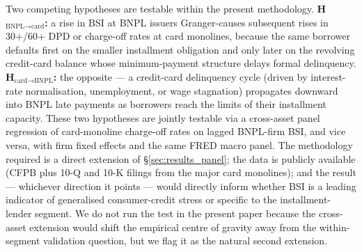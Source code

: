 \documentclass[11pt,a4paper]{article}
\begin{document}
Two competing hypotheses are testable within the present methodology. \textbf{H$_{\text{BNPL} \to \text{card}}$:} a rise in BSI at BNPL issuers Granger-causes subsequent rises in 30+/60+ DPD or charge-off rates at card monolines, because the same borrower defaults first on the smaller installment obligation and only later on the revolving credit-card balance whose minimum-payment structure delays formal delinquency. \textbf{H$_{\text{card} \to \text{BNPL}}$:} the opposite --- a credit-card delinquency cycle (driven by interest-rate normalisation, unemployment, or wage stagnation) propagates downward into BNPL late payments as borrowers reach the limits of their installment capacity. These two hypotheses are jointly testable via a cross-asset panel regression of card-monoline charge-off rates on lagged BNPL-firm BSI, and vice versa, with firm fixed effects and the same FRED macro panel. The methodology required is a direct extension of §\ref{sec:results_panel}; the data is publicly available (CFPB plus 10-Q and 10-K filings from the major card monolines); and the result --- whichever direction it points --- would directly inform whether BSI is a leading indicator of generalised consumer-credit stress or specific to the installment-lender segment. We do not run the test in the present paper because the cross-asset extension would shift the empirical centre of gravity away from the within-segment validation question, but we flag it as the natural second extension.

\renewcommand{\bibsection}{\section{References}\label{sec:refs}}
\end{document}
